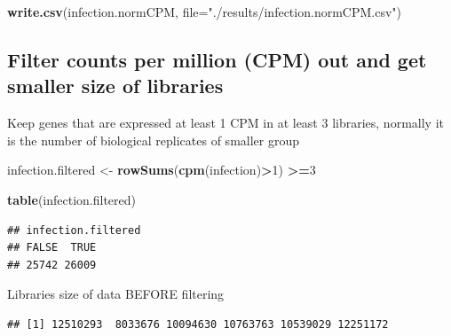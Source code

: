 \documentclass[
]{article}
\newenvironment{Shaded}{\begin{snugshade}}{\end{snugshade}}
\newcommand{\AttributeTok}[1]{\textcolor[rgb]{0.13,0.29,0.53}{#1}}
\newcommand{\DecValTok}[1]{\textcolor[rgb]{0.00,0.00,0.81}{#1}}
\newcommand{\FunctionTok}[1]{\textcolor[rgb]{0.13,0.29,0.53}{\textbf{#1}}}
\newcommand{\NormalTok}[1]{#1}
\newcommand{\OtherTok}[1]{\textcolor[rgb]{0.56,0.35,0.01}{#1}}
\newcommand{\SpecialCharTok}[1]{\textcolor[rgb]{0.81,0.36,0.00}{\textbf{#1}}}
\newcommand{\StringTok}[1]{\textcolor[rgb]{0.31,0.60,0.02}{#1}}
\begin{document}
\begin{Shaded}
\begin{Highlighting}[]
\FunctionTok{write.csv}\NormalTok{(infection.normCPM, }\AttributeTok{file=}\StringTok{"./results/infection.normCPM.csv"}\NormalTok{)}
\end{Highlighting}
\end{Shaded}

\subsection{Filter counts per million (CPM) out and get smaller size of
libraries}\label{filter-counts-per-million-cpm-out-and-get-smaller-size-of-libraries}

Keep genes that are expressed at least 1 CPM in at least 3 libraries,
normally it is the number of biological replicates of smaller group

\begin{Shaded}
\begin{Highlighting}[]
\NormalTok{infection.filtered }\OtherTok{\textless{}{-}} \FunctionTok{rowSums}\NormalTok{(}\FunctionTok{cpm}\NormalTok{(infection)}\SpecialCharTok{\textgreater{}}\DecValTok{1}\NormalTok{) }\SpecialCharTok{\textgreater{}=}\DecValTok{3}
\end{Highlighting}
\end{Shaded}

\begin{Shaded}
\begin{Highlighting}[]
\FunctionTok{table}\NormalTok{(infection.filtered)}
\end{Highlighting}
\end{Shaded}

\begin{verbatim}
## infection.filtered
## FALSE  TRUE 
## 25742 26009
\end{verbatim}

Libraries size of data BEFORE filtering

\begin{Shaded}
\end{Shaded}

\begin{verbatim}
## [1] 12510293  8033676 10094630 10763763 10539029 12251172
\end{verbatim}
\end{document}
